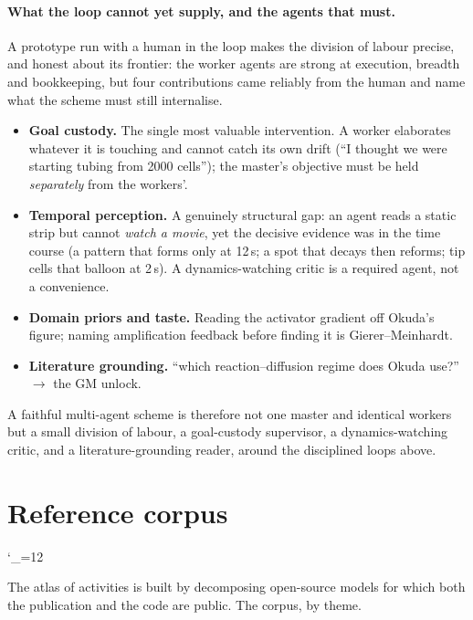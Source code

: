 \documentclass[11pt]{article}
\begin{document}
\paragraph{What the loop cannot yet supply, and the agents that must.}
A prototype run with a human in the loop makes the division of labour precise, and honest
about its frontier: the worker agents are strong at execution, breadth and bookkeeping, but
four contributions came reliably from the human and name what the scheme must still
internalise.
\begin{itemize}
\item \textbf{Goal custody.} The single most valuable intervention. A worker elaborates
whatever it is touching and cannot catch its own drift (``I thought we were starting tubing
from 2000 cells''); the master's objective must be held \emph{separately} from the workers'.
\item \textbf{Temporal perception.} A genuinely structural gap: an agent reads a static
strip but cannot \emph{watch a movie}, yet the decisive evidence was in the time course
(a pattern that forms only at 12\,s; a spot that decays then reforms; tip cells that balloon
at 2\,s). A dynamics-watching critic is a required agent, not a convenience.
\item \textbf{Domain priors and taste.} Reading the activator gradient off Okuda's figure;
naming amplification feedback before finding it is Gierer--Meinhardt.
\item \textbf{Literature grounding.} ``which reaction--diffusion regime does Okuda use?''
$\to$ the GM unlock.
\end{itemize}
A faithful multi-agent scheme is therefore not one master and identical workers but a small
division of labour, a goal-custody supervisor, a dynamics-watching critic, and a
literature-grounding reader, around the disciplined loops above.


\appendix

\section{Reference corpus}
\label{app:corpus}
\catcode`\_=12\relax  %

The atlas of activities is built by decomposing open-source models for which both the
publication and the code are public. The corpus, by theme.
\end{document}
